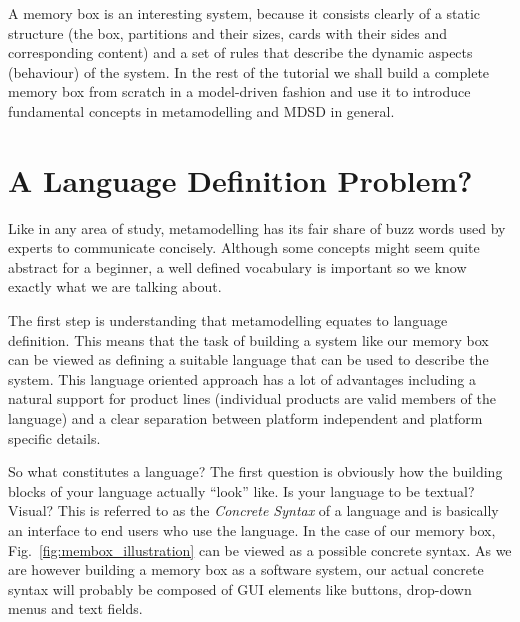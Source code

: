 A memory box is an interesting system, because it consists clearly of a static
structure (the box, partitions and their sizes, cards with their sides and
corresponding content) and a set of rules that describe the dynamic aspects 
(behaviour) of the system.  In the rest of the tutorial we shall build a
complete memory box from scratch in a model-driven fashion and use it to
introduce fundamental concepts in metamodelling and MDSD in general.  

\section{A Language Definition Problem?}

Like in any area of study, metamodelling has its fair share of buzz words used
by experts to communicate concisely.  Although some concepts might seem quite
abstract for a beginner, a well defined vocabulary is important so we know
exactly what we are talking about.   

The first step is understanding that metamodelling equates to language
definition.  This means that the task of building a system like our memory box
can be viewed as defining a suitable language that can be used to describe the
system.  This language oriented approach has a lot of advantages including a
natural support for product lines (individual products are valid members of the
language) and a clear separation between platform independent and platform
specific details.      

So what constitutes a language?  The first question is obviously  how the
building blocks of your language actually ``look'' like.  Is your language to be
textual?  Visual?  This is referred to as the \emph{Concrete Syntax} of a
language and is basically an interface to end users who use the language.  
In the case of our memory box, Fig.~\ref{fig:membox_illustration} can be viewed
as a possible concrete syntax.  As we are however building a memory box as a
software system, our actual concrete syntax  will probably be composed of GUI
elements like buttons, drop-down menus and text fields.   

